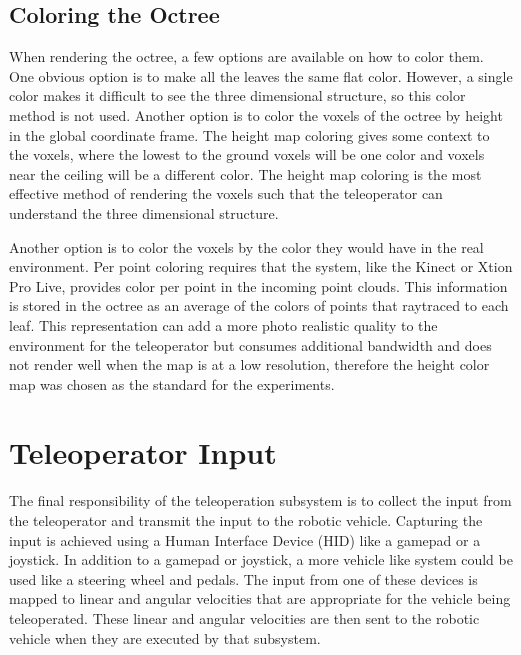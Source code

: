 \documentclass[12pt]{report}
\begin{document}
\subsection{Coloring the Octree}
When rendering the octree, a few options are available on how to color them.  One obvious option is to make all the leaves the same flat color.  However, a single color makes it difficult to see the three dimensional structure, so this color method is not used.  Another option is to color the voxels of the octree by height in the global coordinate frame.  The height map coloring gives some context to the voxels, where the lowest to the ground voxels will be one color and voxels near the ceiling will be a different color.  The height map coloring is the most effective method of rendering the voxels such that the teleoperator can understand the three dimensional structure.

Another option is to color the voxels by the color they would have in the real environment.  Per point coloring requires that the system, like the Kinect or Xtion Pro Live, provides color per point in the incoming point clouds.  This information is stored in the octree as an average of the colors of points that raytraced to each leaf.  This representation can add a more photo realistic quality to the environment for the teleoperator but consumes additional bandwidth and does not render well when the map is at a low resolution, therefore the height color map was chosen as the standard for the experiments.

\section{Teleoperator Input}
The final responsibility of the teleoperation subsystem is to collect the input from the teleoperator and transmit the input to the robotic vehicle.  Capturing the input is achieved using a Human Interface Device (HID) like a gamepad or a joystick.  In addition to a gamepad or joystick, a more vehicle like system could be used like a steering wheel and pedals.  The input from one of these devices is mapped to linear and angular velocities that are appropriate for the vehicle being teleoperated.  These linear and angular velocities are then sent to the robotic vehicle when they are executed by that subsystem.

\end{document}
